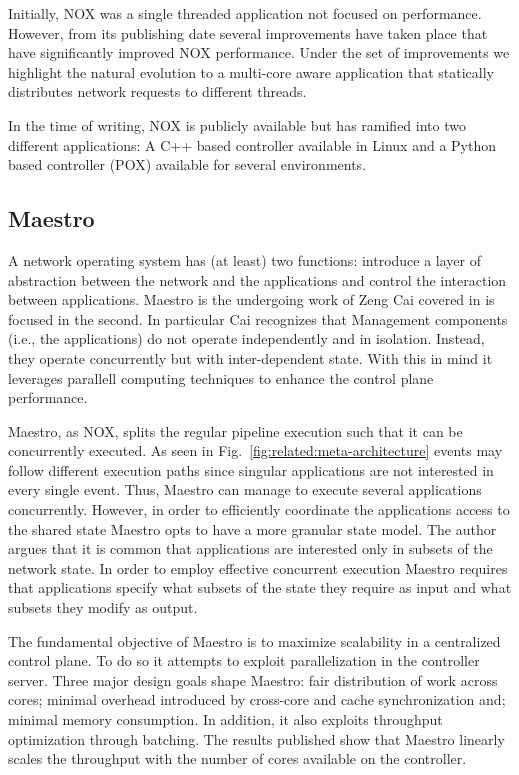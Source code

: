 Initially, NOX was a single threaded application not focused on performance. 
However, from its publishing date several improvements have taken place \cite{Tootoonchian:2012uia,zen-doc-thesis} that have significantly improved NOX performance. 
Under the set of improvements we highlight the natural evolution to a multi-core aware application that statically distributes network requests to different threads. 

In the time of writing, NOX is publicly available but has ramified into two different applications: A C++ based controller available in Linux and a Python based controller (POX) available for several environments.

\subsection{Maestro}
\label{sec:related:maestro}


A network operating system has (at least) two functions: introduce a layer of abstraction between the network and the applications and control the interaction between applications. Maestro is the undergoing work of Zeng Cai covered in \cite{maestro} is focused in the second. In particular Cai recognizes that Management components (i.e., the applications)  do not operate independently and in isolation. Instead, they operate
concurrently but with inter-dependent state. 
With this in mind it leverages parallell computing techniques to enhance the control plane performance. 

Maestro, as NOX, splits the regular pipeline execution such that it can be concurrently executed. As seen in Fig.~\ref{fig:related:meta-architecture} events may
follow different execution paths since singular applications are not interested in every single event. 
Thus, Maestro can manage to execute several applications concurrently. However, in order to
efficiently coordinate the applications access to the shared state Maestro opts to have a more granular state model. 
The author argues that it is
common that applications are interested only in subsets of the network state. 
In order to employ effective concurrent execution Maestro requires that applications specify  what subsets of the state they require as input and what subsets they modify as output. 

The fundamental objective of Maestro is to maximize scalability in a centralized control plane. To do so it attempts to exploit parallelization in the controller server.  Three major design goals shape Maestro: fair distribution of work across cores; minimal overhead introduced by cross-core and cache synchronization and;
minimal memory consumption. In addition, it also
exploits throughput optimization through batching. 
The results published show that Maestro linearly scales the throughput with the number of cores available on the controller. 

